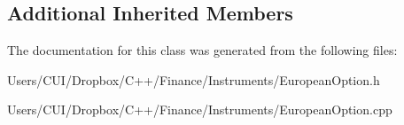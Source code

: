 \subsection*{Additional Inherited Members}


The documentation for this class was generated from the following files\+:\begin{DoxyCompactItemize}
\item 
Users/\+C\+U\+I/\+Dropbox/\+C++/\+Finance/\+Instruments/European\+Option.\+h\item 
Users/\+C\+U\+I/\+Dropbox/\+C++/\+Finance/\+Instruments/European\+Option.\+cpp\end{DoxyCompactItemize}
